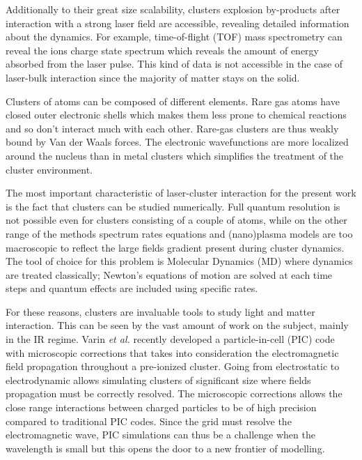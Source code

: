 Additionally to their great size scalability, clusters explosion by-products
after interaction with a strong laser field are accessible, revealing detailed
information about the dynamics. For example, time-of-flight (TOF) mass
spectrometry can reveal the ions charge state spectrum which reveals the amount
of energy absorbed from the laser pulse. This kind of data is not accessible
in the case of laser-bulk interaction since the majority of matter stays on the
solid.

Clusters of atoms can be composed of different elements. Rare gas atoms have
closed outer electronic shells which makes them less prone to chemical
reactions and so don't interact much with each other. Rare-gas clusters are
thus weakly bound by Van der Waals forces. The electronic wavefunctions are
more localized around the nucleus than in metal clusters which simplifies the
treatment of the cluster environment.


The most important characteristic of laser-cluster interaction for the present
work is the fact that clusters can be studied numerically. Full quantum resolution
is not possible even for clusters consisting of a couple of atoms, while on the
other range of the methods spectrum rates equations and (nano)plasma models are
too macroscopic to reflect the large fields gradient present during cluster
dynamics\cite{Fennel2010}. The tool of choice for this problem is Molecular Dynamics
(MD) where dynamics are treated classically; Newton's equations of motion are
solved at each time steps and quantum effects are included using specific rates.

For these reasons, clusters are invaluable tools to study light and matter
interaction. This can be seen by the vast amount of work on the subject, mainly
in the IR regime\cite{Fennel2010}. Varin \textit{et al.}\cite{Varin2012} recently
developed a particle-in-cell (PIC) code with microscopic corrections that takes
into consideration the electromagnetic field propagation throughout a pre-ionized
cluster. Going from electrostatic to electrodynamic allows simulating clusters
of significant size where fields propagation must be correctly resolved. The
microscopic corrections allows the close range interactions between
charged particles to be of high precision compared to traditional PIC
codes\cite{Peltz2012}. Since the grid must resolve the electromagnetic wave,
PIC simulations can thus be a challenge when the wavelength is small but this
opens the door to a new frontier of modelling.


